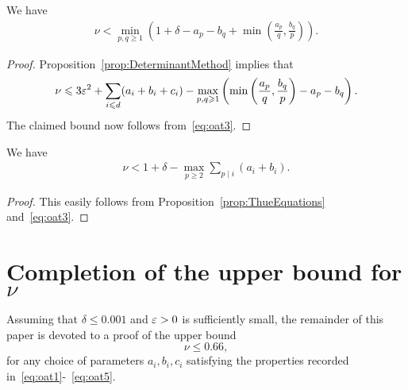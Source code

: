 \begin{proposition} \label{prop:DeterminantBound}
We have
\begin{align*}
\nu < \min_{p,q\ge1} \left( 1+\delta- a_p - b_q +\min\left(\frac{a_p}{q}, \frac{b_q}{p}\right)\right).
\end{align*}
\end{proposition}
\begin{proof}
Proposition~\ref{prop:DeterminantMethod} implies
that
\[
\nu\leqslant 3\varepsilon^2+
\sum_{i\leqslant d} (a_i+b_i+c_i)
-\max_{p,q\geqslant 1} \left(\min\left(
\frac{a_p}{q}, \frac{b_q}{p}\right)
-a_p-b_q\right).
\]
The claimed bound now follows from~\eqref{eq:oat3}.
\end{proof}


\begin{proposition} \label{prop:ThueBound}
We have
\begin{align*}
\nu < 1 +\delta- \max_{p\ge2}\sum_{p\mid i}(a_i+b_i).
\end{align*}
\end{proposition}
\begin{proof}
This easily follows from Proposition~\ref{prop:ThueEquations} and~\eqref{eq:oat3}.
\end{proof}


\section{Completion of the upper bound for \texorpdfstring{$\nu$}{nu}}

Assuming that
 $\delta\leq 0.001$ and
$\varepsilon>0$ is sufficiently small,
the remainder of this paper is devoted to a proof of the upper bound
\[\nu \le 0.66,
\]
for any choice of parameters $a_i,b_i ,c_i$ satisfying the properties recorded in~\eqref{eq:oat1}-~\eqref{eq:oat5}.


